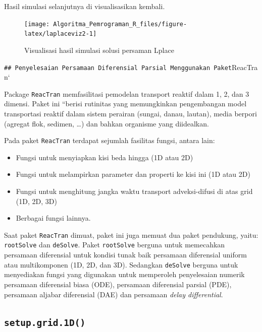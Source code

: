 \documentclass[
]{book}
\providecommand{\tightlist}{%
  \setlength{\itemsep}{0pt}\setlength{\parskip}{0pt}}
\theoremstyle{definition}
\theoremstyle{definition}
\theoremstyle{definition}
\theoremstyle{definition}
\theoremstyle{remark}
\begin{document}
Hasil simulasi selanjutnya di visualisasikan kembali.

\begin{figure}

{\centering \texttt{[image: Algoritma\_Pemrograman\_R\_files/figure-latex/laplaceviz2-1]} 

}

\caption{Visualisasi hasil simulasi solusi persaman Lplace}\label{fig:laplaceviz2}
\end{figure}

\texttt{\#\#\ Penyelesaian\ Persamaan\ Diferensial\ Parsial\ Menggunakan\ Paket}ReacTran`

Package \texttt{ReacTran} memfasilitasi pemodelan transport reaktif dalam 1, 2, dan 3 dimensi. Paket ini ``berisi rutinitas yang memungkinkan pengembangan model transportasi reaktif dalam sistem perairan (sungai, danau, lautan), media berpori (agregat flok, sedimen, \ldots) dan bahkan organisme yang diidealkan.

Pada paket \texttt{ReacTran} terdapat sejumlah fasilitas fungsi, antara lain:

\begin{itemize}
\tightlist
\item
  Fungsi untuk menyiapkan kisi beda hingga (1D atau 2D)
\item
  Fungsi untuk melampirkan parameter dan properti ke kisi ini (1D atau 2D)
\item
  Fungsi untuk menghitung jangka waktu transport adveksi-difusi di atas grid (1D, 2D, 3D)
\item
  Berbagai fungsi lainnya.
\end{itemize}

Saat paket \texttt{ReacTran} dimuat, paket ini juga memuat dua paket pendukung, yaitu: \texttt{rootSolve} dan \texttt{deSolve}. Paket \texttt{rootSolve} berguna untuk memecahkan persamaan diferensial untuk kondisi tunak baik persamaan diferensial uniform atau multikomponen (1D, 2D, dan 3D). Sedangkan \texttt{deSolve} berguna untuk menyediakan fungsi yang digunakan untuk memperoleh penyelesaian numerik persamaan diferensial biasa (ODE), persamaan diferensial parsial (PDE), persamaan aljabar diferensial (DAE) dan persamaan \emph{delay differential}.

\hypertarget{setup.grid.1d}{%
\subsection{\texorpdfstring{\texttt{setup.grid.1D()}}{setup.grid.1D()}}\label{setup.grid.1d}}
\end{document}

